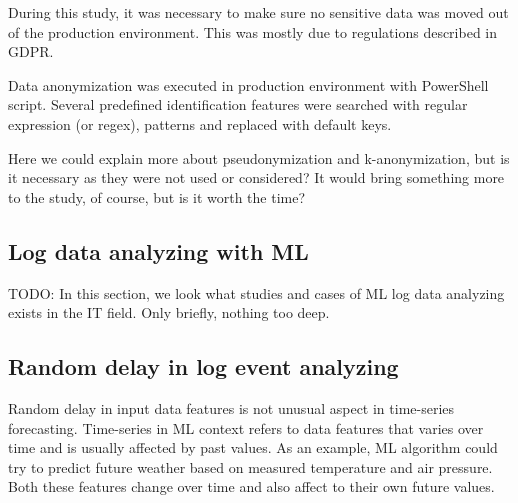 During this study,
it was necessary to make sure no sensitive data
was moved out of the production environment.
This was mostly due to regulations described in GDPR. %

Data anonymization was executed in production environment
with PowerShell script.
Several predefined identification features were searched with
regular expression (or regex), patterns and replaced with
default keys.

\begin{itcomment} %
    Here we could explain more about pseudonymization and k-anonymization,
    but is it necessary as they were not used or considered?
    It would bring something more to the study, of course,
    but is it worth the time?
\end{itcomment}



\subsection{Log data analyzing with ML}\label{subsec:bg-log-data-analyzing-with-ml}
TODO: In this section, we look
what studies and cases of ML log data analyzing exists in the IT field.
Only briefly, nothing too deep.



\subsection{Random delay in log event analyzing}\label{subsec:bg-random-delay}

Random delay in input data features
is not unusual aspect in time-series forecasting.
Time-series in ML context
refers to data features that varies over time
and is usually affected by past values.
As an example,
ML algorithm could try to predict future weather
based on measured temperature and air pressure.
Both these features change over time
and also affect to their own future values.

